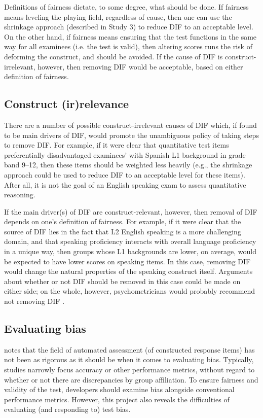 \documentclass [PhD] {uclathes}
\begin{document}
Definitions of fairness dictate, to some degree, what should be done. If fairness means leveling the playing field, regardless of cause, then one can use the shrinkage approach (described in Study 3) to reduce DIF to an acceptable level. On the other hand, if fairness means ensuring that the test functions in the same way for all examinees (i.e. the test is valid), then altering scores runs the risk of deforming the construct, and should be avoided. If the cause of DIF is construct-irrelevant, however, then removing DIF would be acceptable, based on either definition of fairness.

\subsection{Construct (ir)relevance}

There are a number of possible construct-irrelevant causes of DIF which, if found to be main drivers of DIF, would promote the unambiguous policy of taking steps to remove DIF. For example, if it were clear that quantitative test items preferentially disadvantaged examinees’ with Spanish L1 background in grade band 9–12, then these items should be weighted less heavily (e.g., the shrinkage approach could be used to reduce DIF to an acceptable level for these items). After all, it is not the goal of an English speaking exam to assess quantitative reasoning. 

If the main driver(s) of DIF are construct-relevant, however, then removal of DIF depends on one’s definition of fairness. For example, if it were clear that the source of DIF lies in the fact that L2 English speaking is a more challenging domain, and that speaking proficiency interacts with overall language proficiency in a unique way, then groups whose L1 backgrounds are lower, on average, would be expected to have lower scores on speaking items. In this case, removing DIF would change the natural properties of the speaking construct itself. Arguments about whether or not DIF should be removed in this case could be made on either side; on the whole, however, psychometricians would probably recommend not removing DIF \citep{aera2014}. 

\subsection{Evaluating bias}

\citet{ormerod2022automated} notes that the field of automated assessment (of constructed response items) has not been as rigorous as it should be when it comes to evaluating bias. Typically, studies narrowly focus accuracy or other performance metrics, without regard to whether or not there are discrepancies by group affiliation. To ensure fairness and validity of the test, developers should examine bias alongside conventional performance metrics. However, this project also reveals the difficulties of evaluating (and responding to) test bias. 
\end{document}
